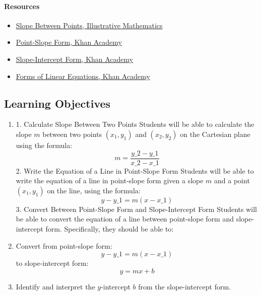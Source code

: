 \paragraph{Resources}

\begin{itemize}
    \item \href{https://tasks.illustrativemathematics.org/content-standards/tasks/1537}{Slope Between Points, Illustrative Mathematics}
    \item \href{https://www.khanacademy.org/math/algebra/x2f8bb11595b61c86:forms-of-linear-equations/x2f8bb11595b61c86:point-slope-form/v/idea-behind-point-slope-form}{Point-Slope Form, Khan Academy}
    \item \href{https://www.khanacademy.org/math/algebra/x2f8bb11595b61c86:forms-of-linear-equations/x2f8bb11595b61c86:intro-to-slope-intercept-form/v/slope-intercept-form}{Slope-Intercept Form, Khan Academy}
    \item \href{https://www.khanacademy.org/math/algebra/x2f8bb11595b61c86:forms-of-linear-equations/x2f8bb11595b61c86:summary-forms-of-two-variable-linear-equations/a/forms-of-linear-equations-review}{Forms of Linear Equations, Khan Academy}
\end{itemize}

\subsection{Learning Objectives}

\begin{enumerate}
    \item 1. Calculate Slope Between Two Points Students will be able to calculate the slope $m$ between two points $(x_1, y_1)$ and $(x_2, y_2)$ on the Cartesian plane using the formula: $$ m = \frac{y\_2 - y\_1}{x\_2 - x\_1} $$ 2. Write the Equation of a Line in Point-Slope Form Students will be able to write the equation of a line in point-slope form given a slope $m$ and a point $(x_1, y_1)$ on the line, using the formula: $$ y - y\_1 = m (x - x\_1) $$ 3. Convert Between Point-Slope Form and Slope-Intercept Form Students will be able to convert the equation of a line between point-slope form and slope-intercept form. Specifically, they should be able to:
    \item Convert from point-slope form: $$ y - y\_1 = m (x - x\_1) $$ to slope-intercept form: $$ y = mx + b $$
    \item Identify and interpret the $y$-intercept $b$ from the slope-intercept form.
\end{enumerate}

